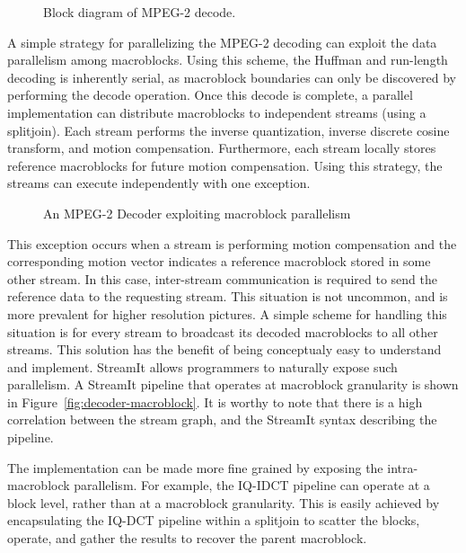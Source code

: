\begin{figure}[htbp]
\centerline{}
\caption{Block diagram of MPEG-2 decode.}
\label{fig:dec_block}
\end{figure}

A simple strategy for parallelizing the MPEG-2 decoding can exploit
the data parallelism among macroblocks. Using this scheme, the Huffman
and run-length decoding is inherently serial, as macroblock boundaries
can only be discovered by performing the decode operation.  Once this
decode is complete, a parallel implementation can distribute
macroblocks to independent streams (using a splitjoin). Each stream
performs the inverse quantization, inverse discrete cosine transform,
and motion compensation. Furthermore, each stream locally stores
reference macroblocks for future motion compensation. Using this
strategy, the streams can execute independently with one exception.

\begin{figure*}[t]
\caption{An MPEG-2 Decoder exploiting macroblock parallelism}
\label{decoder_macroblock_parallelism}
\end{figure*}

This exception occurs when a stream is performing motion compensation
and the corresponding motion vector indicates a reference macroblock
stored in some other stream. In this case, inter-stream communication
is required to send the reference data to the requesting stream. This
situation is not uncommon, and is more prevalent for higher resolution
pictures. A simple scheme for handling this situation is for every
stream to broadcast its decoded macroblocks to all other streams. This
solution has the benefit of being conceptualy easy to understand and
implement. StreamIt allows programmers to naturally expose such
parallelism. A StreamIt pipeline that operates at macroblock
granularity is shown in Figure~\ref{fig:decoder-macroblock}. It is
worthy to note that there is a high correlation between the stream
graph, and the StreamIt syntax describing the pipeline.

The implementation can be made more fine grained by exposing the
intra-macroblock parallelism. For example, the IQ-IDCT pipeline can
operate at a block level, rather than at a macroblock
granularity. This is easily achieved by encapsulating the IQ-DCT pipeline
within a splitjoin to scatter the blocks, operate, and gather the
results to recover the parent macroblock.

